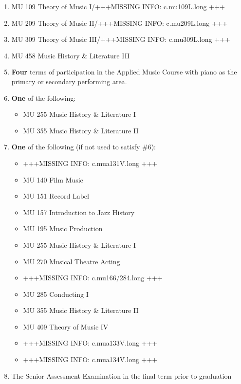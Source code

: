 \documentclass[
  letterpaper,
]{scrbook}
\providecommand{\tightlist}{%
  \setlength{\itemsep}{0pt}\setlength{\parskip}{0pt}}
\begin{document}
\begin{enumerate}
\def\labelenumi{\arabic{enumi}.}
\tightlist
\item
  MU 109 Theory of Music I/+++MISSING INFO: c.mu109L.long +++
\item
  MU 209 Theory of Music II/+++MISSING INFO: c.mu209L.long +++
\item
  MU 309 Theory of Music III/+++MISSING INFO: c.mu309L.long +++
\item
  MU 458 Music History \& Literature III
\item
  \textbf{Four} terms of participation in the Applied Music Course with
  piano as the primary or secondary performing area.
\item
  \textbf{One} of the following:

  \begin{itemize}
  \tightlist
  \item
    MU 255 Music History \& Literature I
  \item
    MU 355 Music History \& Literature II
  \end{itemize}
\item
  \textbf{One} of the following (if not used to satisfy \#6):

  \begin{itemize}
  \tightlist
  \item
    +++MISSING INFO: c.mua131V.long +++
  \item
    MU 140 Film Music
  \item
    MU 151 Record Label
  \item
    MU 157 Introduction to Jazz History
  \item
    MU 195 Music Production
  \item
    MU 255 Music History \& Literature I
  \item
    MU 270 Musical Theatre Acting
  \item
    +++MISSING INFO: c.mu166/284.long +++
  \item
    MU 285 Conducting I
  \item
    MU 355 Music History \& Literature II
  \item
    MU 409 Theory of Music IV
  \item
    +++MISSING INFO: c.mua133V.long +++
  \item
    +++MISSING INFO: c.mua134V.long +++
  \end{itemize}
\item
  The Senior Assessment Examination in the final term prior to
  graduation
\end{enumerate}
\end{document}
